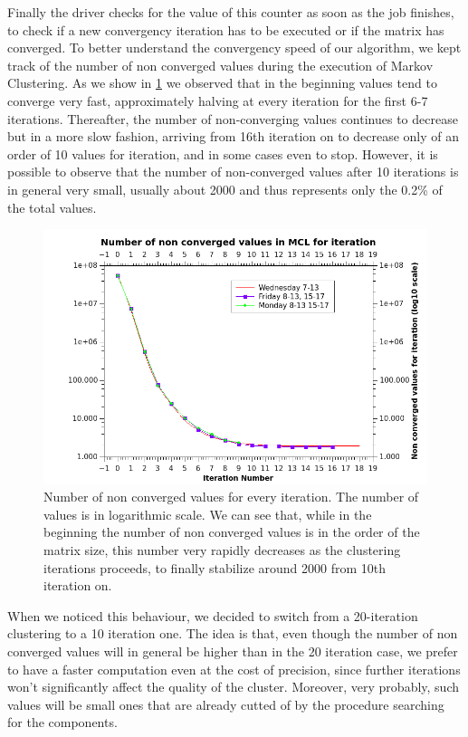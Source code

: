 Finally the driver checks for the value of this counter as soon as the job finishes, to check if a new convergency iteration
has to be executed or if the matrix has converged.
To better understand the convergency speed of our algorithm, we kept track of the number of non converged values during the
execution of Markov Clustering. 
As we show in \ref{fig:convergencyGraph} we observed that in the beginning values tend to converge very fast, approximately halving at every iteration for the first 6-7 iterations. Thereafter, the number of non-converging values continues to decrease
but in a more slow fashion, arriving from 16th iteration on to decrease only of an order of 10 values for iteration, and in some cases even to stop. However, it is possible to observe that the number of non-converged values after 10 iterations is in general very small, usually about 2000 and thus represents only the 0.2\% of the total values.
\begin{figure}[H]
\centering
\includegraphics[scale=0.8]{convergency.png}
\caption{Number of non converged values for every iteration. The number of values is in logarithmic scale. We can see that, while in the beginning the number of non converged values is in the order of the matrix size, this number very rapidly decreases as the clustering iterations proceeds, to finally stabilize around 2000 from 10th iteration on.} %
\label{fig:convergencyGraph}
\end{figure}
When we noticed this behaviour, we decided to switch from a 20-iteration clustering to a 10 iteration one. The idea is that, even though the number of non converged values will in general be higher than in the 20 iteration case, we prefer to have a faster computation even at the cost of precision, since further iterations won't significantly affect the quality of the cluster. Moreover, very probably, such values will be small ones that are already cutted of by the procedure searching for the components.

